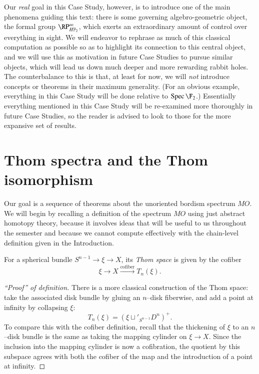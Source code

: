 Our \emph{real} goal in this Case Study, however, is to introduce one of the main phenomena guiding this text: there is some governing algebro-geometric object, the formal group $\RP^\infty_{\HFtwo}$, which exerts an extraordinary amount of control over everything in sight.  We will endeavor to rephrase as much of this classical computation as possible so as to highlight its connection to this central object, and we will use this as motivation in future Case Studies to pursue similar objects, which will lead us down much deeper and more rewarding rabbit holes.  The counterbalance to this is that, at least for now, we will \emph{\emph{not}} introduce concepts or theorems in their maximum generality.  (For an obvious example, everything in this Case Study will be done relative to $\Spec \F_2$.)  Essentially everything mentioned in this Case Study will be re-examined more thoroughly in future Case Studies, so the reader is advised to look to those for the more expansive set of results.






\section{Thom spectra and the Thom isomorphism}\label{LectureThomSpectra}

Our goal is a sequence of theorems about the unoriented bordism spectrum $MO$.  We will begin by recalling a definition of the spectrum $MO$ using just abstract homotopy theory, because it involves ideas that will be useful to us throughout the semester and because we cannot compute effectively with the chain-level definition given in the Introduction.

\begin{definition}
For a spherical bundle $S^{n-1} \to \xi \to X$, its \textit{Thom space} is given by the cofiber \[\xi \to X \xrightarrow{\text{cofiber}} T_n(\xi).\]
\end{definition}
\begin{proof}[``Proof'' of definition]
There is a more classical construction of the Thom space: take the associated disk bundle by gluing an $n$--disk fiberwise, and add a point at infinity by collapsing $\xi$: \[T_n(\xi) = (\xi \sqcup'_{S^{n-1}} D^n)^+.\]  To compare this with the cofiber definition, recall that the thickening of $\xi$ to an $n$--disk bundle is the same as taking the mapping cylinder on $\xi \to X$.  Since the inclusion into the mapping cylinder is now a cofibration, the quotient by this subspace agrees with both the cofiber of the map and the introduction of a point at infinity.
\end{proof}


